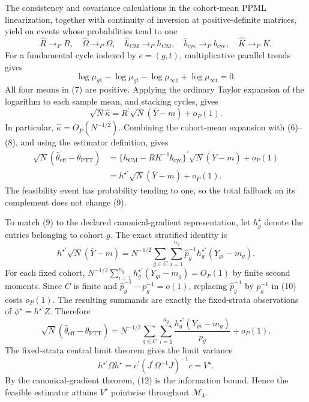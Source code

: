The consistency and covariance calculations in the cohort-mean PPML linearization, together with continuity of inversion at positive-definite matrices, yield on events whose probabilities tend to one
\[
\widehat R\to_PR,
\quad \widehat\Omega\to_P\Omega,
\quad \widehat h_{\mathrm{CM}}\to_Ph_{\mathrm{CM}},
\quad \widehat b_{\mathrm{cyc}}\to_Pb_{\mathrm{cyc}},
\quad \widehat K\to_PK.                                                 \tag{6}
\]
For a fundamental cycle indexed by \(e=(g,t)\), multiplicative parallel trends gives
\[
\log\mu_{g1}-\log\mu_{gt}-\log\mu_{\infty1}+\log\mu_{\infty t}=0.  \tag{7}
\]
All four means in (7) are positive.  Applying the ordinary Taylor expansion of the logarithm to each sample mean, and stacking cycles, gives
\[
\sqrt N\widehat\kappa
=R^{\prime}\sqrt N(\overline Y-m)+o_P(1).                              \tag{8}
\]
In particular, \(\widehat\kappa=O_P(N^{-1/2})\).  Combining the cohort-mean expansion with (6)--(8), and using the estimator definition, gives
\[
\begin{aligned}
\sqrt N(\widehat\theta_{\mathrm{eff}}-\theta_{\mathrm{PTT}})
&=\{h_{\mathrm{CM}}-RK^{-1}b_{\mathrm{cyc}}\}^{\prime}
  \sqrt N(\overline Y-m)+o_P(1)\\
&=h^{\star\prime}\sqrt N(\overline Y-m)+o_P(1).                       \tag{9}
\end{aligned}
\]
The feasibility event has probability tending to one, so the total fallback on its complement does not change (9).

To match (9) to the declared canonical-gradient representation, let \(h_g^{\star}\) denote the entries belonging to cohort \(g\).  The exact stratified identity is
\[
h^{\star\prime}\sqrt N(\overline Y-m)
=N^{-1/2}\sum_{g\in C}\sum_{i=1}^{n_g}
 \widehat p_g^{-1}h_g^{\star\prime}(Y_{gi}-m_g).                       \tag{10}
\]
For each fixed cohort,
\(N^{-1/2}\sum_{i=1}^{n_g}h_g^{\star\prime}(Y_{gi}-m_g)=O_P(1)\) by finite second moments.  Since \(C\) is finite and
\(\widehat p_g^{-1}-p_g^{-1}=o(1)\), replacing \(\widehat p_g^{-1}\) by \(p_g^{-1}\) in (10) costs \(o_P(1)\).  The resulting summands are exactly the fixed-strata observations of \(\phi^{\star}=h^{\star\prime}Z\).  Therefore
\[
\sqrt N(\widehat\theta_{\mathrm{eff}}-\theta_{\mathrm{PTT}})
=N^{-1/2}\sum_{g\in C}\sum_{i=1}^{n_g}
 \frac{h_g^{\star\prime}(Y_{gi}-m_g)}{p_g}+o_P(1).                    \tag{11}
\]
The fixed-strata central limit theorem gives the limit variance
\[
h^{\star\prime}\Omega h^{\star}
=c^{\prime}(J^{\prime}\Omega^{-1}J)^{-1}c
=V^{\star}.                                                            \tag{12}
\]
By the canonical-gradient theorem, (12) is the information bound.  Hence the feasible estimator attains \(V^{\star}\) pointwise throughout \(\mathcal M_4\).

